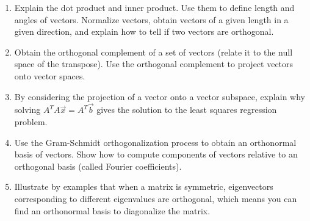 
\begin{enumerate}

\item Explain the dot product and inner product. Use them to define length and angles of vectors. Normalize vectors, obtain vectors of a given length in a given direction, and explain how to tell if two vectors are orthogonal. 

\item Obtain the orthogonal complement of a set of vectors (relate it to the null space of the transpose). Use the orthogonal complement to project vectors onto vector spaces. 

\item By considering the projection of a vector onto a vector subspace, explain why solving $A^TA \vec x = A^T\vec b$ gives the solution to the least squares regression problem.

\item Use the Gram-Schmidt orthogonalization process to obtain an orthonormal basis of vectors. Show how to compute components of vectors relative to an orthogonal basis (called Fourier coefficients).  

\item Illustrate by examples that when a matrix is symmetric, eigenvectors corresponding to different eigenvalues are orthogonal, which means you can find an orthonormal basis to diagonalize the matrix. 

\end{enumerate}
